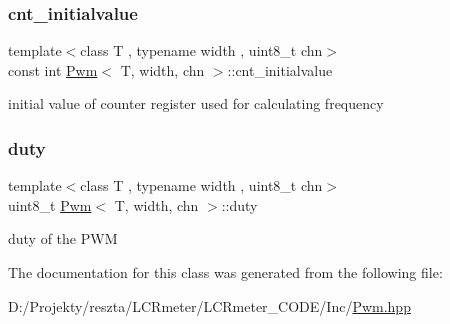 \subsubsection{\texorpdfstring{cnt\_initialvalue}{cnt\_initialvalue}}
{\footnotesize\ttfamily template$<$class T , typename width , uint8\+\_\+t chn$>$ \\
const int \mbox{\hyperlink{class_pwm}{Pwm}}$<$ T, width, chn $>$\+::cnt\+\_\+initialvalue\hspace{0.3cm}{\ttfamily [private]}}



initial value of counter register used for calculating frequency 

\mbox{\label{class_pwm_af344531820202020c97a8421ed5d5e2a}} 
\subsubsection{\texorpdfstring{duty}{duty}}
{\footnotesize\ttfamily template$<$class T , typename width , uint8\+\_\+t chn$>$ \\
uint8\+\_\+t \mbox{\hyperlink{class_pwm}{Pwm}}$<$ T, width, chn $>$\+::duty\hspace{0.3cm}{\ttfamily [private]}}



duty of the P\+WM 



The documentation for this class was generated from the following file\+:\begin{DoxyCompactItemize}
\item 
D\+:/\+Projekty/reszta/\+L\+C\+Rmeter/\+L\+C\+Rmeter\+\_\+\+C\+O\+D\+E/\+Inc/\mbox{\hyperlink{_pwm_8hpp}{Pwm.\+hpp}}\end{DoxyCompactItemize}
